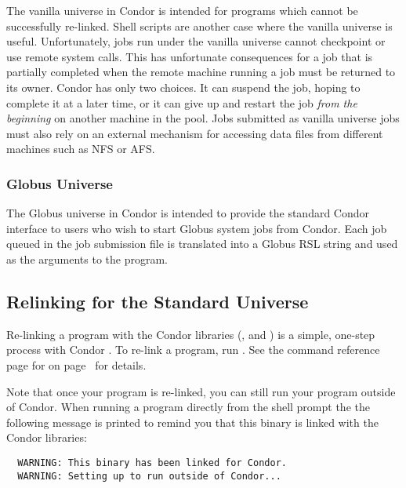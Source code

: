 The vanilla universe in Condor is intended
for programs which cannot
be successfully re-linked.
Shell scripts are another case where the vanilla universe
is useful.
Unfortunately, jobs run under the vanilla universe cannot checkpoint or use
remote system calls. 
This has unfortunate consequences for a job that is partially
completed 
when the remote machine running a job must be returned
to its owner.
Condor has only two choices.  It can suspend the job, hoping to
complete it at a later time,
or it can give up and restart the job \emph{from the beginning} 
on another machine in the pool.
Jobs submitted as vanilla universe jobs must also rely on an
external mechanism 
for accessing data files from different machines
such as NFS or AFS.

\subsubsection{Globus Universe}

The Globus universe in Condor is intended to provide the standard
Condor interface to users who wish to start Globus system jobs
from Condor. Each job queued in the job submission file is translated
into a Globus RSL string and used as the arguments to the 
program.

\subsection{Relinking for the Standard Universe}

Re-linking a program with the Condor libraries (,
 and ) is a
simple, one-step process with Condor \VersionNotice.
To re-link a program, run . 
See the command reference page for  on
page~\pageref{man-condor-compile} for details.

Note that once your program is re-linked, you can still run your program
outside of Condor. When running a program directly from the shell prompt
the the following message is printed to remind you that this 
binary is linked with the Condor libraries:
\begin{verbatim}
  WARNING: This binary has been linked for Condor.
  WARNING: Setting up to run outside of Condor...
\end{verbatim}

